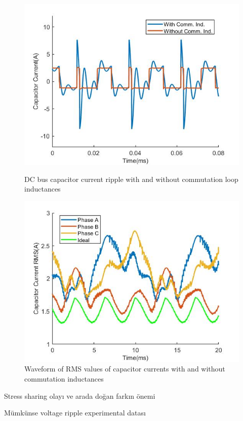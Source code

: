 \begin{figure}[tb]
  \includegraphics[width=\linewidth]{figures/single_module_curr_ripple.jpg}
  \caption{DC bus capacitor current ripple with and without commutation loop inductances}\label{fig:single_module_curr_ripple}
\endminipage\hfill
{}
  \includegraphics[width=\linewidth]{figures/CapacitorCurrentRMS.jpg}
  \caption{Waveform of RMS values of capacitor currents with and without commutation inductances}\label{fig:CapacitorCurrentRMS}
\endminipage
\end{figure}

Stress sharing olayı ve arada doğan farkın önemi

Mümkünse voltage ripple experimental datası


